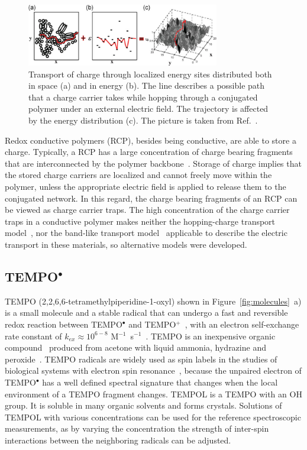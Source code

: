 \begin{figure} [h]
\centering
\includegraphics[width = 0.75\textwidth]{./electrochemistry/figures/hopping.png}
\caption{Transport of charge through localized energy sites distributed both in space (a) and in energy (b). The line describes a possible path that a charge carrier takes while hopping through a conjugated polymer under an external electric field. The trajectory is affected by the energy distribution (c). The picture is taken from Ref.~\cite{Tessler2009}.}
\label{fig:hopping}
\end{figure}

Redox conductive polymers (RCP), besides being conductive, are able to store a charge. Typically, a RCP has a large concentration of charge bearing fragments that are interconnected by the polymer backbone~\cite{Casado_2021_book}. Storage of charge implies that the stored charge carriers are localized and cannot freely move within the polymer, unless the appropriate electric field is applied to release them to the conjugated network. In this regard, the charge bearing fragments of an RCP can be viewed as charge carrier traps. The high concentration of the charge carrier traps in a conductive polymer makes neither the hopping-charge transport model~\cite{Sato2018}, nor the band-like transport model~\cite{Koehler_book} applicable to describe the electric transport in these materials, so alternative models were developed.



\par
\subsection{TEMPO$^{\bullet}$}
TEMPO (2,2,6,6-tetramethylpiperidine-1-oxyl) shown in Figure~\ref{fig:molecules}~a) is a small molecule and a stable radical that can undergo a fast and reversible redox reaction between TEMPO$^\bullet$ and TEMPO$^+$~\cite{Wang2019}, with an electron self-exchange rate constant of $k_{ex}\approx10^{6-8}$ M$^{-1}$~s$^{-1}$~\cite{Chatgilialoglu2012}. TEMPO is an inexpensive organic compound~\cite{Vereshchagin2022} produced from acetone with liquid ammonia, hydrazine and peroxide~\cite{Casado_2021_book}. TEMPO radicals are widely used as spin labels in the studies of biological systems with electron spin resonance~\cite{Bordignon2017}, because the unpaired electron of TEMPO$^\bullet$ has a well defined spectral signature that changes when the local environment of a TEMPO fragment changes. TEMPOL is a TEMPO with an OH group. It is soluble in many organic solvents and forms crystals. Solutions of TEMPOL with various concentrations can be used for the reference spectroscopic measurements, as by varying the concentration the strength of inter-spin interactions between the neighboring radicals can be adjusted.


